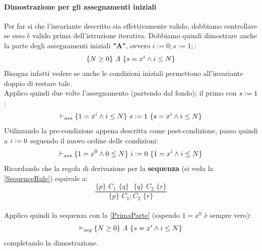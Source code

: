 \begin{esempio}
				      				\paragraph{Dimostrazione per gli assegnamenti iniziali}
				      				Per far si che l'invariante descritto sia effettivamente valido, dobbiamo controllare se esso è valido prima dell'istruzione iterativa.
				      				Dobbiamo quindi dimostrare anche la parte degli assegnamenti iniziali \textbf{"A"}, ovvero $i := 0; s := 1;$:
				      				\begin{align}
				      					\{N\geq 0\}\mbox{ \textit{A} }\{s=x^i\land i\leq N\} 
				      					\label{PrimaParte}                                   
				      				\end{align}
				      				Bisogna infatti vedere se anche le condizioni iniziali permettono
				      				all'invariante doppio di restare tale.\\
				      				Applico quindi due volte l'assegnamento (partendo dal fondo); il primo con
				      				$s\cceq 1$: 
				      				\[\vdash_{ass}\{1=x^i\land i\leq N\}\mbox{ $s\cceq 1$ }\{s=x^i\land i\leq N\}\]
				      				Utilizzando la pre-condizione appena descritta come post-condizione, passo quindi a $i\cceq 0$ seguendo il nuovo ordine delle condizioni:
				      				\[\vdash_{ass}\{1=x^0\land 0\leq N\}\mbox{ $i\cceq 0$ }\{1=x^i\land i\leq N\}\]
				      				Ricordando che la regola di derivazione per la \textbf{sequenza} (si veda la \ref{SequenceRule}) equivale a:   \[\frac{\{p\}\,\, C_1\,\,\{q\}\,\,
				      					\,\,\{q\}\,\, C_2\,\,\{r\}}{\{p\}\,\, C_1;C_2\,\,\{r\}}\] \\Applico quindi la sequenza con la \ref{PrimaParte} (sapendo $1=x^0$ è sempre vero):
				      				\[\vdash_{seq}\{N\geq 0\}\mbox{ \textit{A} }\{s=x^i\land i\leq N\}\]
				      				completando la dimostrazione.\\
				      				\end{esempio}
